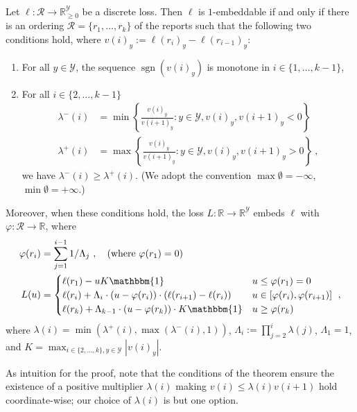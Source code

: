 \documentclass[anon]{colt2020} %
\newcommand{\reals}{\mathbb{R}}
\newcommand{\nonnegreals}{\reals_{\geq 0}}%
\newcommand{\R}{\mathcal{R}}
\newcommand{\Y}{\mathcal{Y}}
\newcommand{\ones}{\mathbbm{1}}
\DeclareMathOperator*{\sgn}{sgn}
\begin{document}

\begin{theorem} \label{thm:construct-1d-loss}
  Let $\ell: \R \to \nonnegreals^{\Y}$ be a discrete loss.
  Then $\ell$ is $1$-embeddable if and only if there is an ordering $\R = \{r_1,\ldots,r_k\}$ of the reports such that the following two conditions hold, where $v(i)_y := \ell(r_i)_y - \ell(r_{i-1})_y$:
  \begin{enumerate}
  \item For all $y\in\Y$, the sequence $\sgn(v(i)_y)$ is monotone in
    $i\in\{1,\ldots,k-1\}$,
  \item For all $i\in\{2,\ldots,k-1\}$
    \begin{align*}
      \lambda^-(i) &= \min \left\{\frac{v(i)_y}{v({i+1})_y} : y\in\Y, v(i)_y, v({i+1})_y < 0\right\}
      \\
      \lambda^+(i) &= \max \left\{\frac{v(i)_y}{v({i+1})_y} : y\in\Y, v(i)_y, v({i+1})_y > 0\right\}~,
    \end{align*}
    we have $\lambda^-(i) \geq \lambda^+(i)$.
    (We adopt the convention $\max\emptyset = -\infty$, $\min\emptyset = +\infty$.)
  \end{enumerate}

  Moreover, when these conditions hold, the loss $L:\reals\to\reals^\Y$ embeds $\ell$ with $\varphi:\R\to\reals$,
  where
  \begin{align*}
    \varphi(r_i) &= \sum_{j=1}^{i-1} 1/\Lambda_j~, \quad \text{(where $\varphi(r_1)=0$)}
    \\
    L(u) &= \begin{cases}
      \ell(r_1) - u K \ones & u \leq \varphi(r_1) = 0 \\
      \ell(r_i) + \Lambda_i \cdot (u - \varphi(r_i)) \cdot  (\ell(r_{i+1})-\ell(r_i)) & u \in [\varphi(r_i),\varphi(r_{i+1})] \\
      \ell(r_k) + \Lambda_{k-1} \cdot (u - \varphi(r_k))\cdot K \ones & u \geq \varphi(r_k)
    \end{cases}~,
  \end{align*}
  where $\lambda(i) = \min(\lambda^+(i),\max(\lambda^-(i),1))$, $\Lambda_i := \prod_{j=2}^i \lambda(j)$, $\Lambda_1=1$, and $K = \max_{i\in\{2,\ldots,k\},y\in\Y} |v(i)_y|$.
\end{theorem}
As intuition for the proof, note that the conditions of the theorem ensure the existence of a positive multiplier $\lambda(i)$ making $v(i) \leq \lambda(i) v(i+1)$ hold coordinate-wise; our choice of $\lambda(i)$ is but one option.
\end{document}
